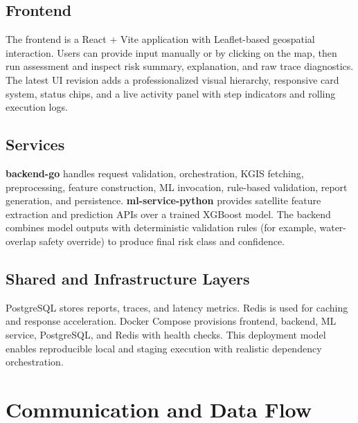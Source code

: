 \documentclass[conference]{IEEEtran}
\begin{document}
\subsection{Frontend}
The frontend is a React + Vite application with Leaflet-based geospatial interaction. Users can provide input manually or by clicking on the map, then run assessment and inspect risk summary, explanation, and raw trace diagnostics. The latest UI revision adds a professionalized visual hierarchy, responsive card system, status chips, and a live activity panel with step indicators and rolling execution logs.

\subsection{Services}
\textbf{backend-go} handles request validation, orchestration, KGIS fetching, preprocessing, feature construction, ML invocation, rule-based validation, report generation, and persistence. \textbf{ml-service-python} provides satellite feature extraction and prediction APIs over a trained XGBoost model. The backend combines model outputs with deterministic validation rules (for example, water-overlap safety override) to produce final risk class and confidence.

\subsection{Shared and Infrastructure Layers}
PostgreSQL stores reports, traces, and latency metrics. Redis is used for caching and response acceleration. Docker Compose provisions frontend, backend, ML service, PostgreSQL, and Redis with health checks. This deployment model enables reproducible local and staging execution with realistic dependency orchestration.

\section{Communication and Data Flow}
\end{document}
